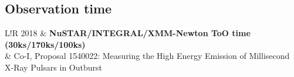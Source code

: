 \documentclass[10pt]{article}
\newcommand\VRule{\color{lightgray}\vrule width 0.5pt}
\begin{document}
%

\vspace{-5pt}
\subsection*{\phantom{sub} Observation time}
\begin{tabular}{L!{\VRule}R}
    2018 & \textbf{NuSTAR/INTEGRAL/XMM-Newton ToO time (30ks/170ks/100ks)} \\
         &  \small{Co-I, Proposal 1540022:} \footnotesize{Measuring the High Energy Emission of Millisecond X-Ray Pulsars in Outburst} \\[1ex]
\end{tabular}
\end{document}

